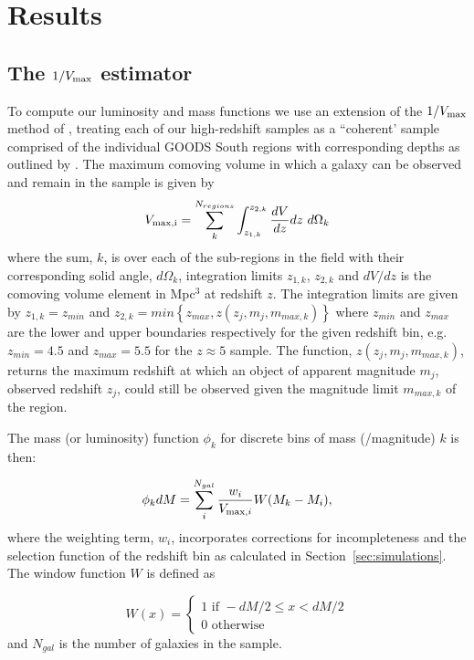 \section{Results}\label{sec:results}
\subsection{The $1/V_{\rm{max}}$ estimator}\label{subsec:vmax}
To compute our luminosity and mass functions we use an extension of the $1/V_{\rm{max}}$ method of \citet{Schmidt:1968wj}, treating each of our high-redshift samples as a ``coherent' sample comprised of the individual GOODS South regions with corresponding depths as outlined by \citet{1980ApJ...235..694A,1993ApJ...404...51E,2005A&A...439..863I}. The maximum comoving volume in which a galaxy can be observed and remain in the sample is given by
\begin{equation}
V_{\rm{max},i} =  \sum_{k}^{N_{regions}} \int_{z_{1,k}}^{z_{2,k}} \frac{dV}{dz} dz~d\Omega_{k}
\end{equation}
where the sum, $k$, is over each of the sub-regions in the field with their corresponding solid angle, $d\Omega_{k}$, integration limits $z_{1,k}$, $z_{2,k}$ and $dV/dz$ is the comoving volume element in Mpc$^{3}$ at redshift $z$.
The integration limits are given by $z_{1,k} = z_{min}$ and $z_{2,k} = min \left \{z_{max},z(z_{j},m_{j},m_{max,k}) \right \}$ where $z_{min}$ and $z_{max}$ are the lower and upper boundaries respectively for the given redshift bin, e.g. $z_{min} = 4.5$ and $z_{max} = 5.5$ for the $z\approx5$ sample. The function, $z(z_{j},m_{j},m_{max,k})$, returns the maximum redshift at which an object of apparent magnitude $m_{j}$, observed redshift $z_{j}$, could still be observed given the magnitude limit $m_{max,k}$ of the region.

The mass (or luminosity) function $\phi_{k}$ for discrete bins of mass (/magnitude) $k$ is then:

\begin{equation}\label{eq:vmaxmethod}
\phi_{k}dM = \sum_{i}^{N_{gal}} \frac{w_{i}}{V_{\textup{max},i}}W(M_{k}-M_{i}),
\end{equation}
where the weighting term, $w_{i}$, incorporates corrections for incompleteness and the selection function of the redshift bin as calculated in Section~\ref{sec:simulations}. The window function $W$ is defined as

\begin{equation}
W(x) = 
\begin{cases}
 1 \text{ if } -dM/2 \leq x < dM/2 \\ 
 0 \text{ otherwise }
\end{cases} 
\end{equation}
and $N_{gal}$ is the number of galaxies in the sample.

